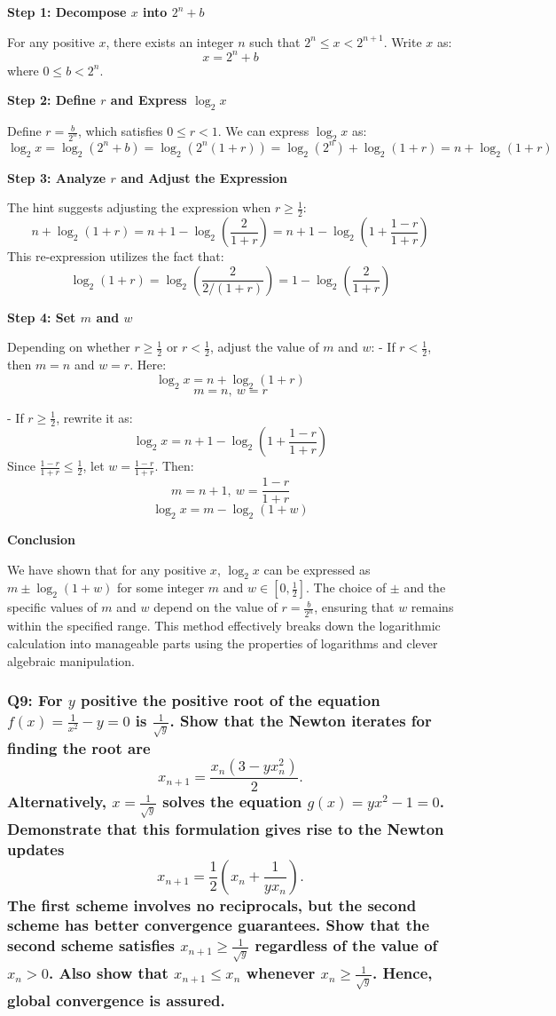 \documentclass[8pt]{article}
\begin{document}
\textbf{Step 1: Decompose \(x\) into \(2^n + b\)}

For any positive \(x\), there exists an integer \(n\) such that \(2^n \leq x < 2^{n+1}\). Write \(x\) as:
\[ x = 2^n + b \]
where \(0 \leq b < 2^n\). 

\textbf{Step 2: Define \(r\) and Express \(\log_2 x\)}

Define \(r = \frac{b}{2^n}\), which satisfies \(0 \leq r < 1\). We can express \(\log_2 x\) as:
\[ \log_2 x = \log_2 (2^n + b) = \log_2 (2^n(1 + r)) = \log_2 (2^n) + \log_2 (1 + r) = n + \log_2 (1 + r) \]

\textbf{Step 3: Analyze \(r\) and Adjust the Expression}

The hint suggests adjusting the expression when \(r \geq \frac{1}{2}\):
\[ n + \log_2 (1 + r) = n + 1 - \log_2 \left(\frac{2}{1 + r}\right) = n + 1 - \log_2 \left(1 + \frac{1 - r}{1 + r}\right) \]
This re-expression utilizes the fact that:
\[ \log_2 (1 + r) = \log_2 \left(\frac{2}{2/(1 + r)}\right) = 1 - \log_2 \left(\frac{2}{1 + r}\right) \]

\textbf{Step 4: Set \(m\) and \(w\)}

Depending on whether \(r \geq \frac{1}{2}\) or \(r < \frac{1}{2}\), adjust the value of \(m\) and \(w\):
- If \(r < \frac{1}{2}\), then \(m = n\) and \(w = r\). Here:
  \[ \log_2 x = n + \log_2 (1 + r) \]
  \[ m = n, \ w = r \]

- If \(r \geq \frac{1}{2}\), rewrite it as:
  \[ \log_2 x = n + 1 - \log_2 \left(1 + \frac{1 - r}{1 + r}\right) \]
  Since \(\frac{1 - r}{1 + r} \leq \frac{1}{2}\), let \(w = \frac{1 - r}{1 + r}\). Then:
  \[ m = n + 1, \ w = \frac{1 - r}{1 + r} \]
  \[ \log_2 x = m - \log_2 (1 + w) \]

\textbf{Conclusion}

We have shown that for any positive \(x\), \(\log_2 x\) can be expressed as \(m \pm \log_2 (1 + w)\) for some integer \(m\) and \(w \in \left[0, \frac{1}{2}\right]\). The choice of \(\pm\) and the specific values of \(m\) and \(w\) depend on the value of \(r = \frac{b}{2^n}\), ensuring that \(w\) remains within the specified range. This method effectively breaks down the logarithmic calculation into manageable parts using the properties of logarithms and clever algebraic manipulation.

\subsubsection*{Q9: For \(y\) positive the positive root of the equation \(f(x) = \frac{1}{x^2} - y = 0\) is \(\frac{1}{\sqrt{y}}\). Show that the Newton iterates for finding the root are
\[ x_{n+1} = \frac{x_n(3 - yx_n^2)}{2}. \]
Alternatively, \(x = \frac{1}{\sqrt{y}}\) solves the equation \(g(x) = yx^2 - 1 = 0\). Demonstrate that this formulation gives rise to the Newton updates
\[ x_{n+1} = \frac{1}{2} \left( x_n + \frac{1}{yx_n} \right). \]
The first scheme involves no reciprocals, but the second scheme has better convergence guarantees. Show that the second scheme satisfies \(x_{n+1} \geq \frac{1}{\sqrt{y}}\) regardless of the value of \(x_n > 0\). Also show that \(x_{n+1} \leq x_n\) whenever \(x_n \geq \frac{1}{\sqrt{y}}\). Hence, global convergence is assured.}
\end{document}
